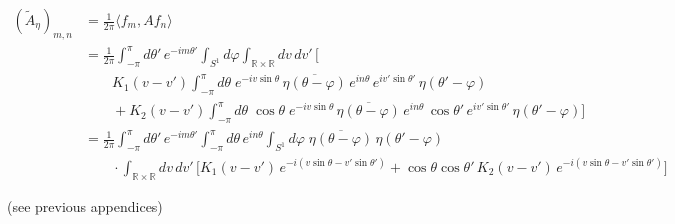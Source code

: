 \documentclass[11pt]{article}
\newcommand{\R}{\mathbb{R}}
\newcommand{\conj}[1]{\overline{#1}}
\begin{document}
\begin{align*}
  (\tilde{A}_{\eta})_{m,n}&=\frac{1}{2\pi}\langle f_m,Af_n\rangle\\
  &=\frac{1}{2\pi}\int_{-\pi}^{\pi}d\theta'\,e^{-im\theta'}
    \int_{S^1}d\varphi\int_{\R\times\R}dv\,dv'\,\Big[\\
  &\qquad K_1(v-v')\int_{-\pi}^{\pi}d\theta\;e^{-iv\sin\theta}\,
    \conj{\eta(\theta-\varphi)}\,e^{in\theta}\,e^{iv'\sin\theta'}\,\eta(\theta'-\varphi)\\
  &\qquad+K_2(v-v')\int_{-\pi}^{\pi}d\theta\;\cos\theta\;e^{-iv\sin\theta}\,
    \conj{\eta(\theta-\varphi)}\,e^{in\theta}\,\cos\theta'\,e^{iv'\sin\theta'}\,
    \eta(\theta'-\varphi)\Big]\\
  &=\frac{1}{2\pi}\int_{-\pi}^{\pi}d\theta'\,e^{-im\theta'}
    \int_{-\pi}^{\pi}d\theta\,e^{in\theta}
    \int_{S^1}d\varphi\;\conj{\eta(\theta-\varphi)}\,\eta(\theta'-\varphi)\\
  &\qquad\cdot\int_{\R\times\R}dv\,dv'\,\Big[
    K_1(v-v')\,e^{-i(v\sin\theta-v'\sin\theta')}
    +\cos\theta\cos\theta'\,K_2(v-v')\,e^{-i(v\sin\theta-v'\sin\theta')}\Big]
\end{align*}
\begin{center}(see previous appendices)\end{center}
\end{document}
